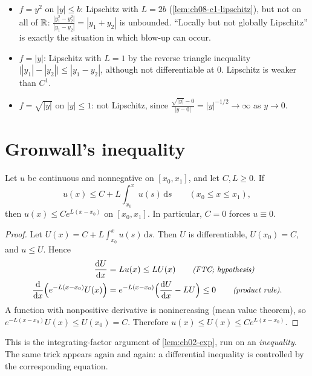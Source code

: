 \begin{example}\label{ex:ch08-lipschitz}
\begin{itemize}
  \item $f = y^2$ on $|y|\le b$: Lipschitz with $L = 2b$ (\cref{lem:ch08-c1-lipschitz}),
        but not on all of $\mathbb{R}$: $\frac{|y_1^2 - y_2^2|}{|y_1 - y_2|} = |y_1 + y_2|$ is
        unbounded. ``Locally but not globally Lipschitz'' is exactly the
        situation in which blow-up can occur.
  \item $f = |y|$: Lipschitz with $L = 1$ by the reverse triangle inequality
        $\bigl||y_1| - |y_2|\bigr|\le|y_1 - y_2|$, although not differentiable at $0$.
        Lipschitz is weaker than $C^1$.
  \item $f = \sqrt{|y|}$ on $|y|\le 1$: not Lipschitz, since
        $\frac{\sqrt{|y|} - 0}{|y - 0|} = |y|^{-1/2}\to\infty$ as $y\to0$.
\end{itemize}
\end{example}

\section{Gronwall's inequality}\label{sec:ch08-gronwall}

\begin{lemma}[Gronwall]\label{lem:ch08-gronwall}
Let $u$ be continuous and nonnegative on $[x_0,x_1]$, and let $C,L\ge0$. If
\[
  u(x)\le C + L\int_{x_0}^{x}u(s)\,\mathrm{d}s\qquad (x_0\le x\le x_1),
\]
then $u(x)\le Ce^{L(x - x_0)}$ on $[x_0,x_1]$. In particular, $C = 0$ forces
$u\equiv0$.
\end{lemma}
\begin{proof}
Let $U(x) = C + L\int_{x_0}^xu(s)\,\mathrm{d}s$. Then $U$ is differentiable,
$U(x_0) = C$, and $u\le U$. Hence
\begin{align*}
  \frac{\mathrm{d}U}{\mathrm{d}x} &= Lu(x)\le LU(x) \qquad\text{\small\itshape(FTC; hypothesis)}\\
  \frac{\mathrm{d}}{\mathrm{d}x}\Bigl(e^{-L(x - x_0)}U(x)\Bigr) &= e^{-L(x-x_0)}\Bigl(\frac{\mathrm{d}U}{\mathrm{d}x} - LU\Bigr)\le 0
     \qquad\text{\small\itshape(product rule)}.
\end{align*}
A function with nonpositive derivative is nonincreasing (mean value theorem),
so $e^{-L(x-x_0)}U(x)\le U(x_0) = C$. Therefore
$u(x)\le U(x)\le Ce^{L(x-x_0)}$.
\end{proof}

This is the integrating-factor argument of \cref{lem:ch02-exp}, run on an
\emph{inequality}. The same trick appears again and again: a differential
inequality is controlled by the corresponding equation.

